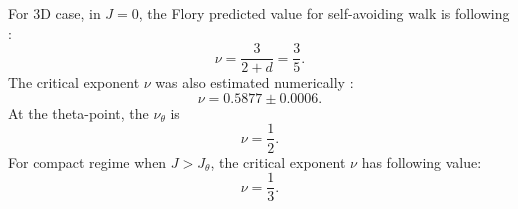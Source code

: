 For 3D case, in $J=0$, the Flory predicted value for self-avoiding walk is following \cite{flory1953principles}:
\begin{equation}
\label{eq:nu_3D_J0_flory}
 \nu = \frac{3}{2+d} = \frac{3}{5}.
\end{equation}
The critical exponent $\nu$ was also estimated numerically \cite{Li1995}:
\begin{equation}
\label{eq:nu_3D_J0_sokal}
\nu = 0.5877 \pm 0.0006.
\end{equation}
 At the theta-point, the $\nu_{\theta}$  is \cite{van2015statistical} 
 \begin{equation}
 \label{eq:nu_3D_Jtheta_flory}
 \nu = \frac{1}{2}.
 \end{equation}
 For compact regime when $J > J_{\theta}$, the critical exponent $\nu$  has following value:  
\begin{equation}
\label{eq:nu_3D_Jglobular_flory}
\nu = \frac{1}{3}.
\end{equation}
